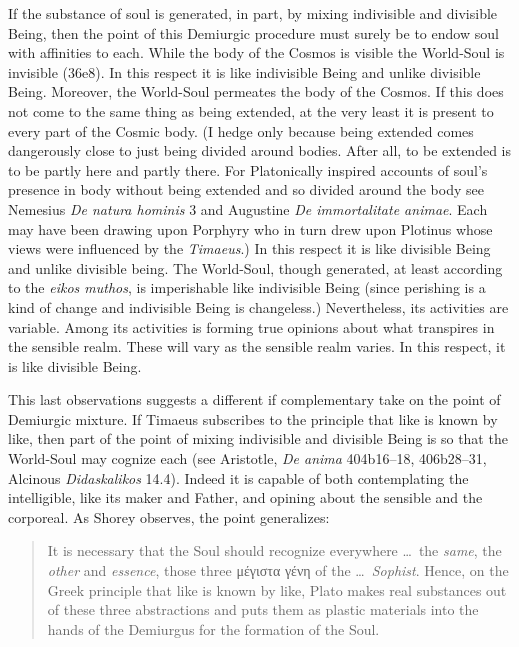 If the substance of soul is generated, in part, by mixing indivisible and divisible Being, then the point of this Demiurgic procedure must surely be to endow soul with affinities to each. While the body of the Cosmos is visible the World-Soul is invisible (36e8). In this respect it is like indivisible Being and unlike divisible Being. Moreover, the World-Soul permeates the body of the Cosmos. If this does not come to the same thing as being extended, at the very least it is present to every part of the Cosmic body. (I hedge only because being extended comes dangerously close to just being divided around bodies. After all, to be extended is to be partly here and partly there. For Platonically inspired accounts of soul's presence in body without being extended and so divided around the body see Nemesius \emph{De natura hominis} 3 and Augustine \emph{De immortalitate animae}. Each may have been drawing upon Porphyry who in turn drew upon Plotinus whose views were influenced by the \emph{Timaeus}.) In this respect it is like divisible Being and unlike divisible being. The World-Soul, though generated, at least according to the \emph{eikos muthos}, is imperishable like indivisible Being (since perishing is a kind of change and indivisible Being is changeless.) Nevertheless, its activities are variable. Among its activities is forming true opinions about what transpires in the sensible realm. These will vary as the sensible realm varies. In this respect, it is like divisible Being.

This last observations suggests a different if complementary take on the point of Demiurgic mixture. If Timaeus subscribes to the principle that like is known by like, then part of the point of mixing indivisible and divisible Being is so that the World-Soul may cognize each (see Aristotle, \emph{De anima} 404b16--18, 406b28--31, Alcinous \emph{Didaskalikos} 14.4). Indeed it is capable of both contemplating the intelligible, like its maker and Father, and opining about the sensible and the corporeal. As Shorey observes, the point generalizes:
\begin{quote}
	It is necessary that the Soul should recognize everywhere \ldots\ the \emph{same}, the \emph{other} and \emph{essence}, those three {\sbl μέγιστα γένη} of the \ldots\ \emph{Sophist}. Hence, on the Greek principle that like is known by like, Plato makes real substances out of these three abstractions and puts them as plastic materials into the hands of the Demiurgus for the formation of the Soul.
\end{quote}

